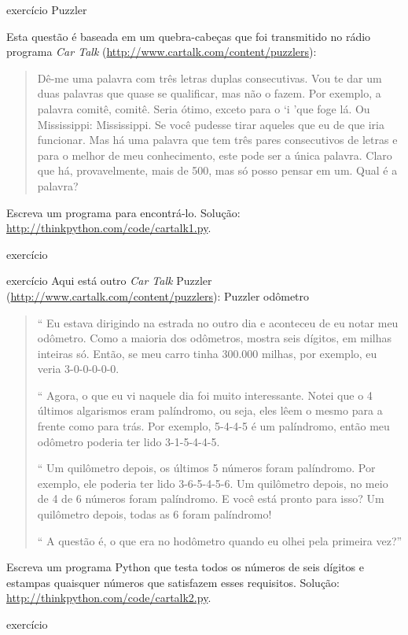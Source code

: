 \documentclass[10pt]{book}
\begin{document}
\begin{} exercício
\index{} Puzzler

Esta questão é baseada em um quebra-cabeças que foi transmitido no rádio
programa {\em Car Talk} 
(\url{http://www.cartalk.com/content/puzzlers}):

\begin{quote}
Dê-me uma palavra com três letras duplas consecutivas. Vou te dar um
duas palavras que quase se qualificar, mas não o fazem. Por exemplo, a palavra
comitê, comitê. Seria ótimo, exceto para o `i 'que
foge lá. Ou Mississippi: Mississippi. Se você pudesse
tirar aqueles que eu de que iria funcionar. Mas há uma palavra que tem três
pares consecutivos de letras e para o melhor de meu conhecimento, este pode
ser a única palavra. Claro que há, provavelmente, mais de 500, mas só posso
pensar em um. Qual é a palavra?
\end{quote}

Escreva um programa para encontrá-lo. Solução: \url{http://thinkpython.com/code/cartalk1.py}.

\end{} exercício


\begin{} exercício
Aqui está outro {\em Car Talk}
Puzzler (\url{http://www.cartalk.com/content/puzzlers}):
\index{} Puzzler
\index{} odômetro

\begin{quote}
`` Eu estava dirigindo na estrada no outro dia e aconteceu de eu
notar meu odômetro. Como a maioria dos odômetros, mostra seis dígitos,
em milhas inteiras só. Então, se meu carro tinha 300.000
milhas, por exemplo, eu veria 3-0-0-0-0-0.

`` Agora, o que eu vi naquele dia foi muito interessante. Notei que o
4 últimos algarismos eram palíndromo, ou seja, eles lêem o mesmo para a frente como
para trás. Por exemplo, 5-4-4-5 é um palíndromo, então meu odômetro
poderia ter lido 3-1-5-4-4-5.

`` Um quilômetro depois, os últimos 5 números foram palíndromo. Por exemplo, ele
poderia ter lido 3-6-5-4-5-6. Um quilômetro depois, no meio de 4 de
6 números foram palíndromo. E você está pronto para isso? Um quilômetro depois,
todas as 6 foram palíndromo!

`` A questão é, o que era no hodômetro quando eu olhei pela primeira vez?''
\end{quote}

Escreva um programa Python que testa todos os números de seis dígitos e estampas
quaisquer números que satisfazem esses requisitos.  
Solução: \url{http://thinkpython.com/code/cartalk2.py}.

\end{} exercício
\end{document}
